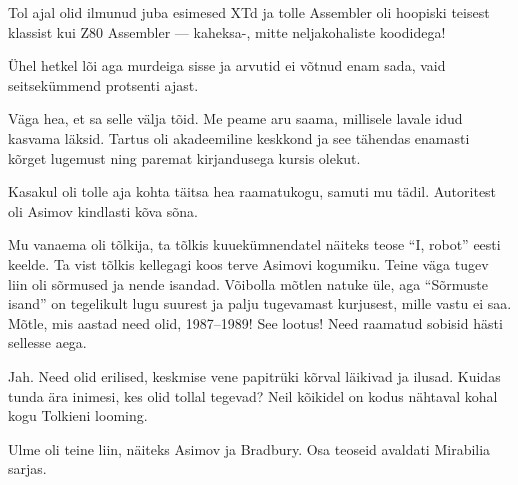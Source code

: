 Tol ajal olid ilmunud juba esimesed XTd ja tolle 
Assembler oli hoopiski teisest klassist kui Z80 Assembler --- kaheksa-, mitte neljakohaliste koodidega! 

Ühel hetkel lõi aga murdeiga sisse ja arvutid ei võtnud enam sada, vaid seitsekümmend protsenti ajast. 


Väga hea, et sa selle välja tõid. Me peame aru saama, millisele lavale 
idud kasvama läksid. Tartus oli akadeemiline keskkond ja see tähendas 
enamasti kõrget lugemust ning paremat kirjandusega kursis olekut.

Kasakul oli tolle aja kohta täitsa hea raamatukogu, 
samuti mu tädil. Autoritest oli Asimov
kindlasti kõva sõna. 

Mu vanaema oli tõlkija, ta tõlkis kuuekümnendatel näiteks teose \enquote{I, 
robot} eesti keelde. Ta vist tõlkis kellegagi koos terve Asimovi 
kogumiku. Teine väga tugev liin oli sõrmused ja nende 
isandad. 
Võibolla mõtlen natuke üle, aga \enquote{Sõrmuste isand} on tegelikult lugu suurest ja palju tugevamast kurjusest, mille 
vastu ei saa. Mõtle, mis aastad need olid, 1987--1989! See lootus! Need 
raamatud sobisid hästi sellesse aega.


Jah. Need olid erilised, keskmise vene papitrüki kõrval läikivad ja ilusad. Kuidas tunda ära 
inimesi, kes olid tollal tegevad? Neil kõikidel on kodus nähtaval kohal kogu Tolkieni looming.

Ulme oli teine liin, näiteks Asimov ja Bradbury. Osa teoseid avaldati Mirabilia sarjas. 


